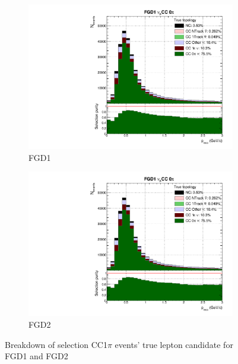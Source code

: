 \begin{figure}[h]
	\begin{subfigure}[t]{0.49\textwidth}
		\includegraphics[width=\textwidth,page=4, trim={0mm 0mm 0mm 9mm}, clip]{figures/mach3/selection/2017b_Diag_WithSelection}
		\caption{FGD1}
	\end{subfigure}
	\begin{subfigure}[t]{0.49\textwidth}
		\includegraphics[width=\textwidth,page=10, trim={0mm 0mm 0mm 9mm}, clip]{figures/mach3/selection/2017b_Diag_WithSelection}
		\caption{FGD2}
	\end{subfigure}
	\caption{Breakdown of selection CC1$\pi$ events' true lepton candidate for FGD1 and FGD2 }
	\label{fig:cc1pi_muon}
\end{figure}

